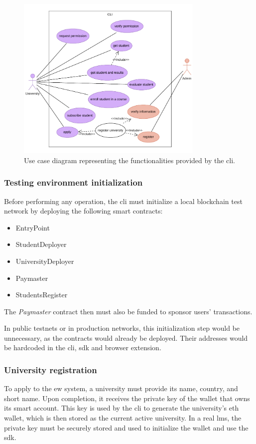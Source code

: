 \begin{figure}
  \centering
  \includegraphics[width=0.8\textwidth]{figures/CLI use case diagram.pdf}
  \caption[\acrshort{cli} use case diagram]{Use case diagram representing the functionalities provided by the \acrshort{cli}.}
  \label{fig:useCaseCli}
\end{figure}

\subsubsection{Testing environment initialization}
Before performing any operation, the \acrshort{cli} must initialize a local blockchain test network by deploying the following smart contracts:
\begin{itemize}
    \item EntryPoint
    \item StudentDeployer
    \item UniversityDeployer
    \item Paymaster
    \item StudentsRegister
\end{itemize}
The \textit{Paymaster} contract then must also be funded to sponsor users' transactions.

In public testnets or in production networks, this initialization step would be unnecessary, as the contracts would already be deployed. Their addresses would be hardcoded in the \acrshort{cli}, \acrshort{sdk} and browser extension.

\subsubsection{University registration}
\label{sssec:applyEw}
To apply to the \acrshort{ew} system, a university must provide its name, country, and short name. Upon completion, it receives the private key of the wallet that owns its smart account. This key is used by the \acrshort{cli} to generate the university's \acrlong{eth} wallet, which is then stored as the current active university. In a real \acrshort{lms}, the private key must be securely stored and used to initialize the wallet and use the \acrshort{sdk}. 

